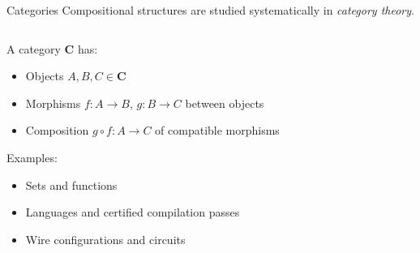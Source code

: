 \documentclass[aspectratio=169,mathserif]{beamer}
\begin{document}
\begin{frame}[fragile]{Categories} %
  Compositional structures are studied systematically
  in \emph{category theory}.

  \vspace{1em}
  \begin{columns}
    \begin{column}{.66\textwidth}
      A category $\mathbf{C}$ has:
      \begin{itemize}
        \item Objects $A, B, C \in \mathbf{C}$
        \item Morphisms $f : A \rightarrow B$, $g : B \rightarrow C$
          between objects
        \item Composition $g \circ f : A \rightarrow C$
          of compatible morphisms
      \end{itemize}
      \vspace{1em}
      Examples:
      \begin{itemize}
        \item Sets and functions
        \item Languages and certified compilation passes
        \item Wire configurations and circuits
      \end{itemize}
    \end{column}
    \begin{column}{.26\textwidth}
      \\ \vspace{3em}
    \end{column}
  \end{columns}
\end{frame}
\end{document}
